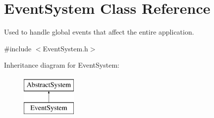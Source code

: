 \hypertarget{class_event_system}{\section{Event\-System Class Reference}
\label{dc/d0b/class_event_system}
}


Used to handle global events that affect the entire application.  




{\ttfamily \#include $<$Event\-System.\-h$>$}

Inheritance diagram for Event\-System\-:\begin{figure}[H]
\begin{center}
\leavevmode
\includegraphics[height=2.000000cm]{dc/d0b/class_event_system}
\end{center}
\end{figure}
